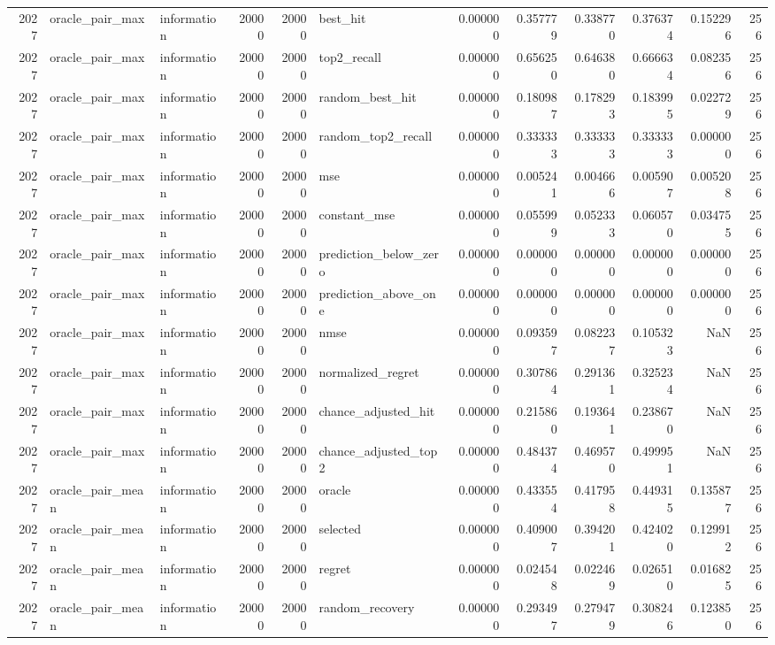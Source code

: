 \begin{tabular}{rllrrlrrrrrr}
2027 & oracle_pair_max & information & 20000 & 20000 & best_hit & 0.000000 & 0.357779 & 0.338770 & 0.376374 & 0.152296 & 256 \\
2027 & oracle_pair_max & information & 20000 & 20000 & top2_recall & 0.000000 & 0.656250 & 0.646380 & 0.666634 & 0.082356 & 256 \\
2027 & oracle_pair_max & information & 20000 & 20000 & random_best_hit & 0.000000 & 0.180987 & 0.178293 & 0.183995 & 0.022729 & 256 \\
2027 & oracle_pair_max & information & 20000 & 20000 & random_top2_recall & 0.000000 & 0.333333 & 0.333333 & 0.333333 & 0.000000 & 256 \\
2027 & oracle_pair_max & information & 20000 & 20000 & mse & 0.000000 & 0.005241 & 0.004666 & 0.005907 & 0.005208 & 256 \\
2027 & oracle_pair_max & information & 20000 & 20000 & constant_mse & 0.000000 & 0.055999 & 0.052333 & 0.060570 & 0.034755 & 256 \\
2027 & oracle_pair_max & information & 20000 & 20000 & prediction_below_zero & 0.000000 & 0.000000 & 0.000000 & 0.000000 & 0.000000 & 256 \\
2027 & oracle_pair_max & information & 20000 & 20000 & prediction_above_one & 0.000000 & 0.000000 & 0.000000 & 0.000000 & 0.000000 & 256 \\
2027 & oracle_pair_max & information & 20000 & 20000 & nmse & 0.000000 & 0.093597 & 0.082237 & 0.105323 & NaN & 256 \\
2027 & oracle_pair_max & information & 20000 & 20000 & normalized_regret & 0.000000 & 0.307864 & 0.291361 & 0.325234 & NaN & 256 \\
2027 & oracle_pair_max & information & 20000 & 20000 & chance_adjusted_hit & 0.000000 & 0.215860 & 0.193641 & 0.238670 & NaN & 256 \\
2027 & oracle_pair_max & information & 20000 & 20000 & chance_adjusted_top2 & 0.000000 & 0.484374 & 0.469570 & 0.499951 & NaN & 256 \\
2027 & oracle_pair_mean & information & 20000 & 20000 & oracle & 0.000000 & 0.433554 & 0.417958 & 0.449315 & 0.135877 & 256 \\
2027 & oracle_pair_mean & information & 20000 & 20000 & selected & 0.000000 & 0.409007 & 0.394201 & 0.424020 & 0.129912 & 256 \\
2027 & oracle_pair_mean & information & 20000 & 20000 & regret & 0.000000 & 0.024548 & 0.022469 & 0.026510 & 0.016825 & 256 \\
2027 & oracle_pair_mean & information & 20000 & 20000 & random_recovery & 0.000000 & 0.293497 & 0.279479 & 0.308246 & 0.123850 & 256 \\

\end{tabular}
